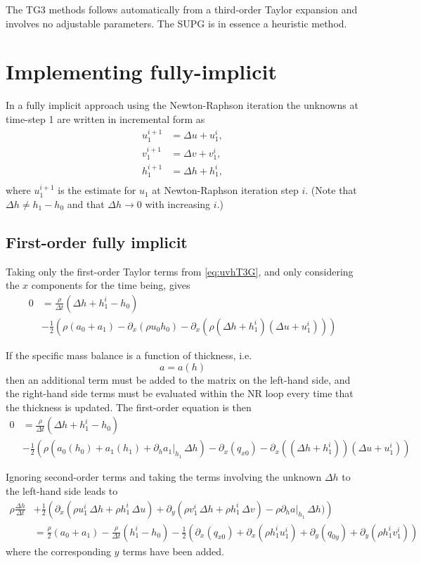 \documentclass[10pt,a4paper]{book}
\newcommand{\p}{\partial}
\begin{document}
The TG3 methods follows automatically from a third-order Taylor
expansion and involves no adjustable parameters. The SUPG is in
essence a heuristic method.


\section{Implementing fully-implicit}

In a fully implicit approach using the Newton-Raphson iteration the unknowns at time-step 1 are written in incremental form as
\begin{align*}
u^{i+1}_1&=\Delta u + u^i_1, \\
v^{i+1}_1&=\Delta v + v^i_1, \\
h^{i+1}_1&=\Delta h + h^i_1, \\
\end{align*}
where $u^{i+1}_1$ is the estimate for $u_1$ at Newton-Raphson
iteration step $i$. (Note that $\Delta h \not = h_1-h_0$ and that
$\Delta h \to 0$ with increasing $i$.)



\subsection{First-order fully implicit}
Taking only the first-order Taylor terms from \eqref{eq:uvhT3G}, and
only considering the $x$ components for the time being, gives
\begin{align*}
0&=\frac{\rho}{\Delta t} (\Delta h + h^i_1-h_0) \\
&- \frac{1}{2}(\rho(a_0+a_1)-\p_x(\rho u_0 h_0)-\p_x(\rho (\Delta h + h^i_1) (\Delta u + u^i_1)))
\end{align*}

If the specific mass balance is a function of thickness, i.e.
\[
a=a(h)
\]
then an additional term must be added to the matrix on the left-hand
side, and the right-hand side terms must be evaluated within the NR
loop every time that the thickness is updated. The first-order equation is then 
\begin{align*}
0&=\frac{\rho}{\Delta t} (\Delta h + h^i_1-h_0) \\
&- \frac{1}{2}\left (\rho \left (a_0(h_0)+a_1(h_1)+ \p_h a_1|_{h_1} \, \Delta h \right )-\p_x(q_{x0})-\p_x((\Delta h + h^i_1)) (\Delta u + u^i_1) \right )
\end{align*}

Ignoring second-order terms and taking the terms involving the unknown
$\Delta h$ to the left-hand side leads to
\begin{align}
\label{eq:fTG}
\rho \frac{\Delta h}{\Delta t}
&+ \frac{1}{2}\left ( \p_x(\rho u^i_1 \, \Delta h  + \rho h^i_1 \,\Delta u ) + \p_y (\rho v^i_1 \, \Delta h  + \rho h^i_1 \,\Delta v )
- \rho \p_h a |_{h_1}\, \Delta h)\right ) \\
  &=\frac{\rho}{2}(a_0+a_1)-\frac{\rho}{\Delta t}  (h^i_1-h_0)- \frac{1}{2}(\p_x(q_{x0})+\p_x(\rho h^i_1 u^i_1) + \p_y(q_{0y})+\p_y(\rho h^i_1 v^i_1))
\nonumber
\end{align}
where the corresponding $y$ terms have been added.
\end{document}
